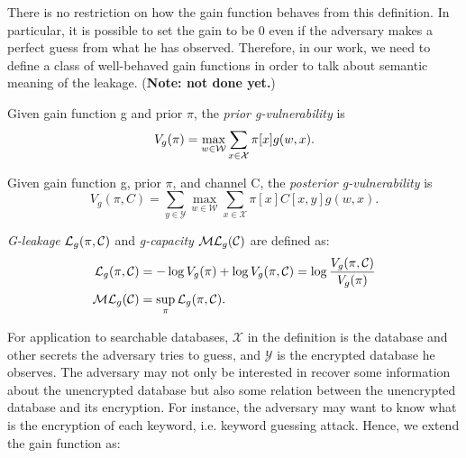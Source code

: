 There is no restriction on how the gain function behaves from this definition. In particular, it is possible to set the gain to be 0 even if the adversary makes a perfect guess from what he has observed. Therefore, in our work, we need to define a class of well-behaved gain functions in order to talk about semantic meaning of the leakage. (\textbf{Note: not done yet.})


\begin{definition}
Given gain function g and prior $\pi$, the \textit{prior g-vulnerability} is
\begin{equation}
V_{g}(\pi)=\max_{w\in {\cal W}}\displaystyle\sum_{x\in {\cal X}}\pi[x]g(w, x).
\end{equation}
\end{definition}


\begin{definition}
Given gain function g, prior $\pi$, and channel C, the \textit{posterior g-vulnerability} is
\begin{equation}
V_{g}(\pi, C) = \sum_{y \in {\mathcal{Y}}} \max_{w \in {\mathcal{W}}} \sum_{x \in {\mathcal{X}}} \pi [x] C[x, y] g(w, x).
\end{equation}
\end{definition}


\begin{definition}
\textit{G-leakage} $\mathcal{L}_{g} (\pi, \mathcal{C})$ and \textit{g-capacity} $\mathcal{ML}_{g} (\mathcal{C})$ are defined as:
\begin{align*}
\mathcal{L}_{g} (\pi, \mathcal{C}) & = - \log V_{g}(\pi) + \log V_{g}(\pi, \mathcal{C}) = \log \frac{V_{g}(\pi, \mathcal{C})}{V_{g}(\pi)} \\
\mathcal{ML}_{g}(\mathcal{C}) &= \sup_{\pi} \mathcal{L}_{g}(\pi, \mathcal{C}). 
\end{align*} 
\end{definition}


For application to searchable databases, $\mathcal{X}$ in the definition is the database and other secrets the adversary tries to guess, and $\mathcal{Y}$ is the encrypted database he observes. The adversary may not only be interested in recover some information about the unencrypted database but also some relation between the unencrypted database and its encryption. For instance, the adversary may want to know what is the encryption of each keyword, i.e. keyword guessing attack. Hence, we extend the gain function as:

